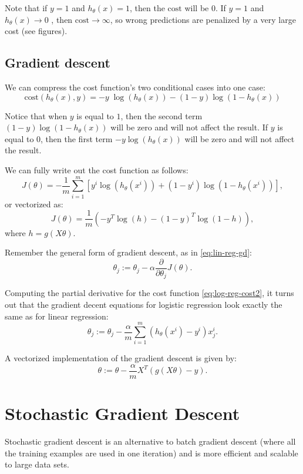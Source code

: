 \documentclass[a4paper,11pt]{report}
\newcommand{\cost}{\mathrm{cost}}
\begin{document}
Note that if $y = 1$ and $h_\theta(x) = 1$, then the $\cost$ will be $0$. If $y = 1$ and $h_\theta(x) \longrightarrow 0$ , then $\cost\longrightarrow \infty$, so wrong predictions are penalized by a very large cost (see figures).

\subsection*{Gradient descent}

 We can compress the cost function's two conditional cases into one case: $$\cost(h_\theta(x),y) = - y \; \log(h_\theta(x)) - (1 - y) \log(1 - h_\theta(x))$$

Notice that when $y$ is equal to $1$, then the second term $(1-y)\log(1-h_\theta(x))$ will be zero and will not affect the result. If $y$ is equal to $0$, then the first term $-y \log(h_\theta(x))$ will be zero and will not affect the result.

We can fully write out the cost function as follows:
\begin{equation}\label{eq:log-reg-cost2}
J(\theta) = - \frac{1}{m} \displaystyle \sum_{i=1}^m [y^{i}\log (h_\theta (x^{i})) + (1 - y^{i})\log (1 - h_\theta(x^{i}))],
\end{equation}
or vectorized as:
\begin{equation}\label{eq:log-reg-cost-vec}
J(\theta)  = \frac{1}{m} \left(-y^{T}\log(h)-(1-y)^{T}\log(1-h)\right),
\end{equation}
where $h = g(X\theta)$.

Remember the general form of gradient descent, as in \eqref{eq:lin-reg-gd}: $$\theta_j := \theta_j - \alpha \dfrac{\partial}{\partial \theta_j}J(\theta).$$

Computing the partial derivative for the cost function \eqref{eq:log-reg-cost2}, it turns out that the gradient decent equations for logistic regression look exactly the same as for linear regression:
$$\theta_j := \theta_j - \frac{\alpha}{m} \sum_{i=1}^m (h_\theta(x^{i}) - y^{i}) x_j^{i}.$$

A vectorized implementation of the gradient descent is given by: $$\theta := \theta - \frac{\alpha}{m} X^{T} (g(X \theta ) - {y}).$$

\section*{Stochastic Gradient Descent}

Stochastic gradient descent is an alternative to batch gradient descent (where all the training examples are used in one iteration) and is more efficient and scalable to large data sets.
\end{document}
